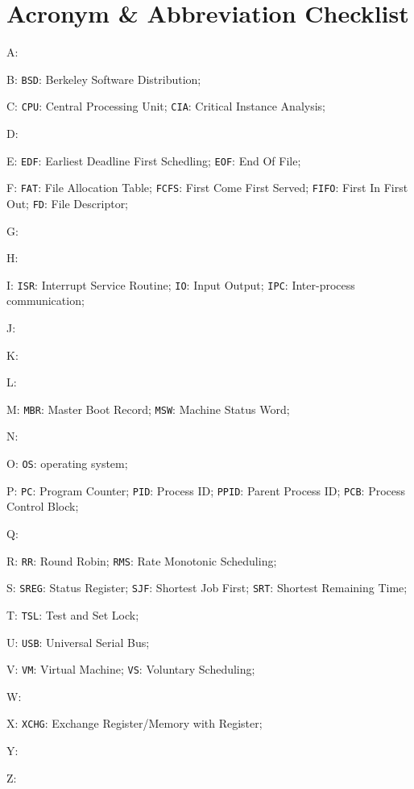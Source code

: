 \documentclass[11pt,a4paper]{article}
\theoremstyle{definition}
\begin{document}
\newpage
\section{Acronym \& Abbreviation Checklist}
A:

B: \texttt{BSD}: Berkeley Software Distribution; 

C: \texttt{CPU}: Central Processing Unit; \texttt{CIA}: Critical Instance Analysis; 

D:

E: \texttt{EDF}: Earliest Deadline First Schedling; \texttt{EOF}: End Of File; 

F: \texttt{FAT}: File Allocation Table; \texttt{FCFS}: First Come First Served; \texttt{FIFO}: First In First Out; \texttt{FD}: File Descriptor; 

G:

H:

I: \texttt{ISR}: Interrupt Service Routine; \texttt{IO}: Input Output; \texttt{IPC}: Inter-process communication;

J:

K:

L:

M: \texttt{MBR}: Master Boot Record;  \texttt{MSW}: Machine Status Word;

N:

O: \texttt{OS}: operating system; 

P: \texttt{PC}: Program Counter; \texttt{PID}: Process ID; \texttt{PPID}: Parent Process ID; \texttt{PCB}: Process Control Block;

Q:

R: \texttt{RR}: Round Robin; \texttt{RMS}: Rate Monotonic Scheduling; 

S: \texttt{SREG}: Status Register;
  \texttt{SJF}: Shortest Job First; \texttt{SRT}: Shortest Remaining Time;

T: \texttt{TSL}: Test and Set Lock;

U: \texttt{USB}: Universal Serial Bus;

V: \texttt{VM}: Virtual Machine; \texttt{VS}: Voluntary Scheduling; 

W:

X: \texttt{XCHG}: Exchange Register/Memory with Register;

Y:

Z:



\end{document}

